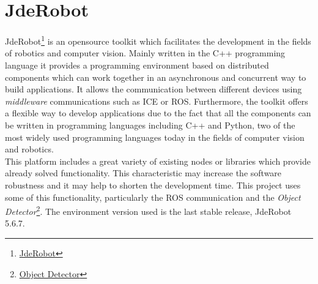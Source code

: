 \section{JdeRobot}
JdeRobot\footnote {\href{https://jderobot.org/Main_Page}{JdeRobot}} is an opensource toolkit which facilitates the development in the fields of robotics and computer vision. Mainly written in the C++ programming language it provides a programming environment based on distributed components which can work together in an asynchronous and concurrent way to build applications. It allows the communication between different devices using \textit{middleware} communications such as ICE or ROS. Furthermore, the toolkit offers a flexible way to develop applications due to the fact that all the components can be written in programming languages including C++ and Python, two of the most widely used programming languages today in the fields of computer vision and robotics.\\
This platform includes a great variety of existing nodes or libraries which provide already solved functionality. This characteristic may increase the software robustness and it may help to shorten the development time. This project uses some of this functionality, particularly the ROS communication and the \textit{Object Detector}\footnote {\label{object_detector}\href{https://github.com/JdeRobot/dl-objectdetector}{Object Detector}}. The environment version used is the last stable release, JdeRobot 5.6.7.
